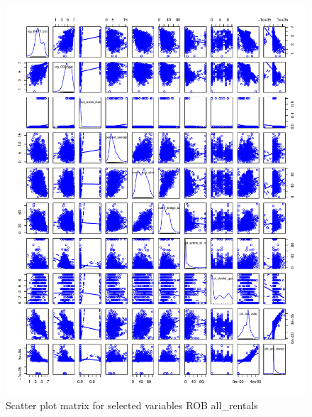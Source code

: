 \documentclass[10pt, letterpaper]{amsart}
\begin{document}
\begin{figure}[H]
  \caption{Scatter plot matrix for selected variables ROB all\_rentals}
  \includegraphics[scale=0.6]{spm_selected_ROB_allrentals}
\end{figure}
\end{document}
